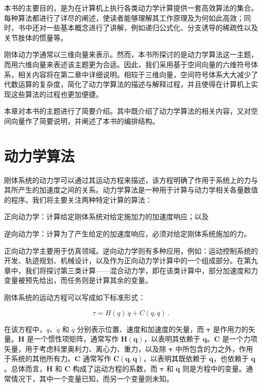 \documentclass[10pt,a4paper]{book}
\theoremstyle{thmstyle} %
\theoremstyle{defstyle} %
\theoremstyle{prostyle} %
\begin{document}
本书的主要目的，是为在计算机上执行各类动力学计算提供一套高效算法的集合。每种算法都进行了详尽的阐述，使读者能够理解其工作原理及为何如此高效；同时，书中还对一些基本概念进行了讲解，例如递归公式化、分支诱导的稀疏性以及关节肢体的惯量等。



刚体动力学通常以三维向量来表示。然而，本书所探讨的是动力学算法这一主题，而用六维向量来表述该主题更为合适。因此，我们采用基于空间向量的六维符号体系，相关内容将在第二章中详细说明。相较于三维向量，空间符号体系大大减少了代数运算的复杂度，简化了动力学算法的描述与解释过程，并且使得在计算机上实现这些算法的过程也更加便捷。



本章对本书的主题进行了简要介绍。其中既介绍了动力学算法的相关内容，又对空间向量作了简要说明，并阐述了本书的编排结构。



\section{动力学算法}





刚体系统的动力学可以通过其运动方程来描述，该方程明确了作用于系统上的力与其所产生的加速度之间的关系。动力学算法是一种用于计算与动力学相关各量数值的程序。我们将主要关注两种特定计算的算法：



正向动力学：计算给定刚体系统对给定施加力的加速度响应；以及



逆向动力学：计算为了产生给定的加速度响应，必须对给定刚体系统施加的力。



正向动力学主要用于仿真领域。逆向动力学则有多种应用，例如：运动控制系统的开发、轨迹规划、机械设计，以及作为正向动力学计算中的一个组成部分。在第九章中，我们将探讨第三类计算——混合动力学，即在该类计算中，部分加速度和力变量被预先给出，而任务则是计算其余的变量。



刚体系统的运动方程可以写成如下标准形式：



$$
\tau = H ( q ) \, \ddot { q } + C ( q , \dot { q } ) \, .
$$



在该方程中，$q$、$\dot{q}$ 和 $\ddot{q}$ 分别表示位置、速度和加速度的矢量，而 $\boldsymbol{\tau}$ 是作用力的矢量。$\boldsymbol{H}$ 是一个惯性项矩阵，通常写作 $\boldsymbol{H}(\boldsymbol{q})$，以表明其依赖于 $\boldsymbol{q}$。$\boldsymbol{C}$ 是一个力项矢量，用于考虑科里奥利力、离心力、重力，以及除 $\boldsymbol{\tau}$ 中所包含的力之外，作用于系统的其他所有力。$\boldsymbol{C}$ 通常写作 $\boldsymbol{C}(\boldsymbol{q}, \dot{\boldsymbol{q}})$，以表明其既依赖于 $\boldsymbol{q}$，也依赖于 $\dot{\boldsymbol{q}}$。总体而言，$\boldsymbol{H}$ 和 $\boldsymbol{C}$ 构成了运动方程的系数，而 $\boldsymbol{\tau}$ 和 $\ddot{\boldsymbol{q}}$ 则是方程中的变量。通常情况下，其中一个变量已知，而另一个变量则未知。
\end{document}
